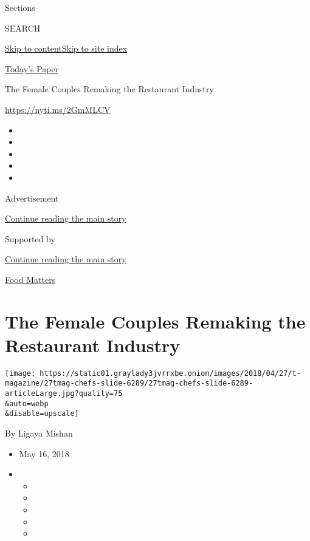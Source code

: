 Sections

SEARCH

\protect\hyperlink{site-content}{Skip to
content}\protect\hyperlink{site-index}{Skip to site index}

\href{https://myaccount.nytimes3xbfgragh.onion/auth/login?response_type=cookie\&client_id=vi}{}

\href{https://www.nytimes3xbfgragh.onion/section/todayspaper}{Today's
Paper}

The Female Couples Remaking the Restaurant Industry

\url{https://nyti.ms/2GmMLCV}

\begin{itemize}
\item
\item
\item
\item
\item
\end{itemize}

Advertisement

\protect\hyperlink{after-top}{Continue reading the main story}

Supported by

\protect\hyperlink{after-sponsor}{Continue reading the main story}

\href{/column/food-matters}{Food Matters}

\hypertarget{the-female-couples-remaking-the-restaurant-industry}{%
\section{The Female Couples Remaking the Restaurant
Industry}\label{the-female-couples-remaking-the-restaurant-industry}}

\texttt{[image: https://static01.graylady3jvrrxbe.onion/images/2018/04/27/t-magazine/27tmag-chefs-slide-6289/27tmag-chefs-slide-6289-articleLarge.jpg?quality=75\\\&auto=webp\\\&disable=upscale]}

By Ligaya Mishan

\begin{itemize}
\item
  May 16, 2018
\item
  \begin{itemize}
  \item
  \item
  \item
  \item
  \item
  \end{itemize}
\end{itemize}

